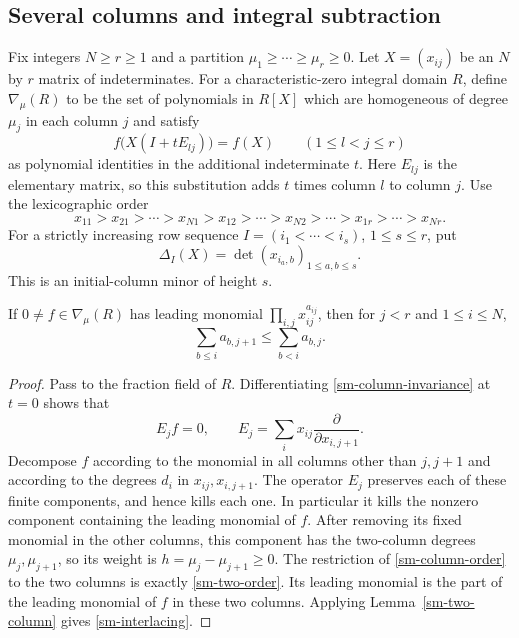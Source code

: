 \subsection{Several columns and integral subtraction}

Fix integers $N\ge r\ge1$ and a partition
$\mu_1\ge\cdots\ge\mu_r\ge0$. Let $X=(x_{ij})$ be an $N$ by $r$
matrix of indeterminates. For a characteristic-zero integral domain
$R$, define $\nabla_\mu(R)$ to be the set of polynomials in $R[X]$
which are homogeneous of degree $\mu_j$ in each column $j$ and
satisfy
\begin{equation}\label{sm-column-invariance}
          f\bigl(X(I+tE_{lj})\bigr)=f(X)
                    \qquad(1\le l<j\le r)
\end{equation}
as polynomial identities in the additional indeterminate $t$.
Here $E_{lj}$ is the elementary matrix, so this substitution adds
$t$ times column $l$ to column $j$.
Use the lexicographic order
\begin{equation}\label{sm-column-order}
 x_{11}>x_{21}>\cdots>x_{N1}>
 x_{12}>\cdots>x_{N2}>\cdots>x_{1r}>\cdots>x_{Nr}.
\end{equation}
For a strictly increasing row sequence
$I=(i_1<\cdots<i_s)$, $1\le s\le r$, put
\[
               \Delta_I(X)=
                 \det(x_{i_a,b})_{1\le a,b\le s}.
\]
This is an initial-column minor of height $s$.

\begin{lemma}\label{sm-leading-interlacing}
If $0\ne f\in\nabla_\mu(R)$ has leading monomial
$\prod_{i,j}x_{ij}^{a_{ij}}$, then for $j<r$ and $1\le i\le N$,
\begin{equation}\label{sm-interlacing}
                   \sum_{b\le i}a_{b,j+1}
                         \le\sum_{b<i}a_{b,j}.
\end{equation}
\end{lemma}
\begin{proof}
Pass to the fraction field of $R$. Differentiating
\eqref{sm-column-invariance} at $t=0$ shows that
\[
                       E_jf=0,\qquad
              E_j=\sum_i x_{ij}\frac{\partial}{\partial x_{i,j+1}}.
\]
Decompose $f$ according to the monomial in all columns other than
$j,j+1$ and according to the degrees
$d_i$ in $x_{ij},x_{i,j+1}$. The operator $E_j$ preserves each
of these finite components, and hence kills each one.
In particular it kills the nonzero component containing the leading
monomial of $f$. After removing its fixed monomial in the other
columns, this component has the two-column degrees $\mu_j,\mu_{j+1}$,
so its weight is $h=\mu_j-\mu_{j+1}\ge0$.
The restriction of \eqref{sm-column-order} to the two columns is
exactly \eqref{sm-two-order}. Its leading monomial is the part of
the leading monomial of $f$ in these two columns. Applying
Lemma~\ref{sm-two-column} gives \eqref{sm-interlacing}.
\end{proof}


